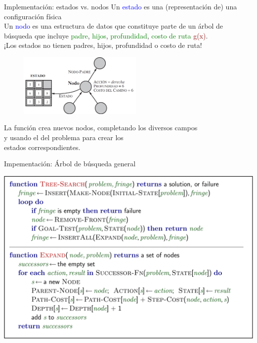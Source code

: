 \documentclass{beamer}
\theoremstyle{definition}
\theoremstyle{theorem}
\theoremstyle{remark}
\begin{document}
\begin{frame}{Implementación: estados vs. nodos}
Un \textcolor{blue}{estado} es una (representación de) una configuración física\\
Un \textcolor{blue}{nodo} es una estructura de datos que constituye parte de un árbol de búsqueda que incluye \textcolor{Green}{padre}, \textcolor{Green}{hijos}, \textcolor{Green}{profundidad}, \textcolor{Green}{costo de ruta} \textcolor{DarkRed}{g(x)}.\\
¡Los estados no tienen padres, hijos, profundidad o costo de ruta!
\begin{figure}
    \centering
    \includegraphics[width = 60mm, scale = 0.7]{29_image.PNG}
\end{figure}
La función  crea nuevos nodos, completando los diversos campos\\
\hspace{0.8cm}y usando el  del problema para crear los\\
\hspace{0.8cm}estados correspondientes.
\end{frame}

\begin{frame}{Impementación: Árbol de búsqueda general}
\begin{right}

\includegraphics[scale = 0.5]{30_general_tree_search.png}

\end{right}
\end{frame}
\end{document}
